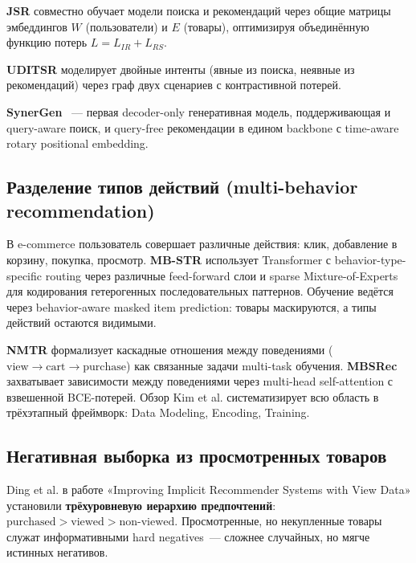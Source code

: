 \textbf{JSR} \cite{zamani2020jsr} совместно обучает модели поиска и рекомендаций через общие матрицы эмбеддингов $W$ (пользователи) и $E$ (товары), оптимизируя объединённую функцию потерь $L = L_{IR} + L_{RS}$.

\textbf{UDITSR} \cite{uditsr2024} моделирует двойные интенты (явные из поиска, неявные из рекомендаций) через граф двух сценариев с контрастивной потерей.

\textbf{SynerGen} \cite{synergen2025}~--- первая decoder-only генеративная модель, поддерживающая и query-aware поиск, и query-free рекомендации в едином backbone с time-aware rotary positional embedding.

\subsection{Разделение типов действий (multi-behavior recommendation)}
\label{subsec:ch1:multibehavior}

В e-commerce пользователь совершает различные действия: клик, добавление в корзину, покупка, просмотр. \textbf{MB-STR} \cite{yuan2022mbstr} использует Transformer с behavior-type-specific routing через различные feed-forward слои и sparse Mixture-of-Experts для кодирования гетерогенных последовательных паттернов. Обучение ведётся через behavior-aware masked item prediction: товары маскируются, а типы действий остаются видимыми.

\textbf{NMTR} \cite{gao2019nmtr} формализует каскадные отношения между поведениями ($\text{view} \to \text{cart} \to \text{purchase}$) как связанные задачи multi-task обучения. \textbf{MBSRec} \cite{mbsrec2024} захватывает зависимости между поведениями через multi-head self-attention с взвешенной BCE-потерей. Обзор Kim et al. \cite{kim2026survey} систематизирует всю область в трёхэтапный фреймворк: Data Modeling, Encoding, Training.

\subsection{Негативная выборка из просмотренных товаров}
\label{subsec:ch1:negative}

Ding et al. \cite{ding2018view} в работе «Improving Implicit Recommender Systems with View Data» установили \textbf{трёхуровневую иерархию предпочтений}: $\text{purchased} > \text{viewed} > \text{non-viewed}$. Просмотренные, но некупленные товары служат информативными hard negatives~--- сложнее случайных, но мягче истинных негативов.

